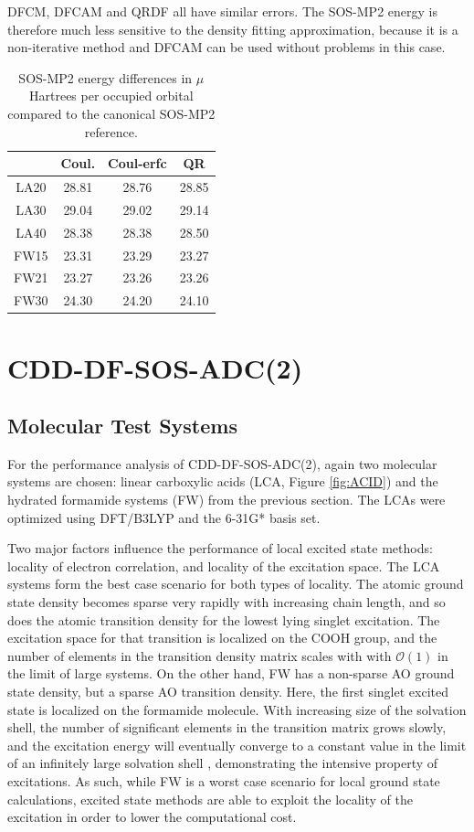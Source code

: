 DFCM, DFCAM and QRDF all have similar errors. The SOS-MP2 energy is therefore much less sensitive to the density fitting approximation, because it is a non-iterative method and DFCAM can be used without problems in this case. 

\begin{table}[h]
\centering
\begin{tabular}{cccc}
 \hline
 & Coul. & Coul-erfc & QR\\ \hline 
LA20 & 28.81 & 28.76 & 28.85 \\ 
LA30  & 29.04 & 29.02 & 29.14 \\ 
LA40 & 28.38 & 28.38 & 28.50 \\ 
FW15 & 23.31 & 23.29 & 23.27 \\ 
FW21 & 23.27 & 23.26 & 23.26 \\ 
FW30 & 24.30 & 24.20 & 24.10 \\ 
\hline 
\end{tabular}
\caption{SOS-MP2 energy differences in $\mu$Hartrees per occupied orbital compared to the canonical SOS-MP2 reference.}
\label{fig:GS_ZACCURACY}
\end{table}

\section{CDD-DF-SOS-ADC(2)}

\subsection{Molecular Test Systems}

For the performance analysis of CDD-DF-SOS-ADC(2), again two molecular systems are chosen: linear carboxylic acids (LCA, Figure \ref{fig:ACID}) and the hydrated formamide systems (FW) from the previous section. The LCAs were optimized using DFT/B3LYP and the 6-31G* basis set.

Two major factors influence the performance of local excited state methods: locality of electron correlation, and locality of the excitation space. The LCA systems form the best case scenario for both types of locality. The atomic ground state density becomes sparse very rapidly with increasing chain length, and so does the atomic transition density for the lowest lying singlet excitation. The excitation space for that transition is localized on the COOH group, and the number of elements in the transition density matrix scales with with $\mathcal{O}(1)$ in the limit of large systems. On the other hand, FW has a non-sparse AO ground state density, but a sparse AO transition density. Here, the first singlet excited state is localized on the formamide molecule. With increasing size of the solvation shell, the number of significant elements in the transition matrix grows slowly, and the excitation energy will eventually converge to a constant value in the limit of an infinitely large solvation shell \cite{Bau2017}, demonstrating the intensive property of excitations. As such, while FW is a worst case scenario for local ground state calculations, excited state methods are able to exploit the locality of the excitation in order to lower the computational cost.   


